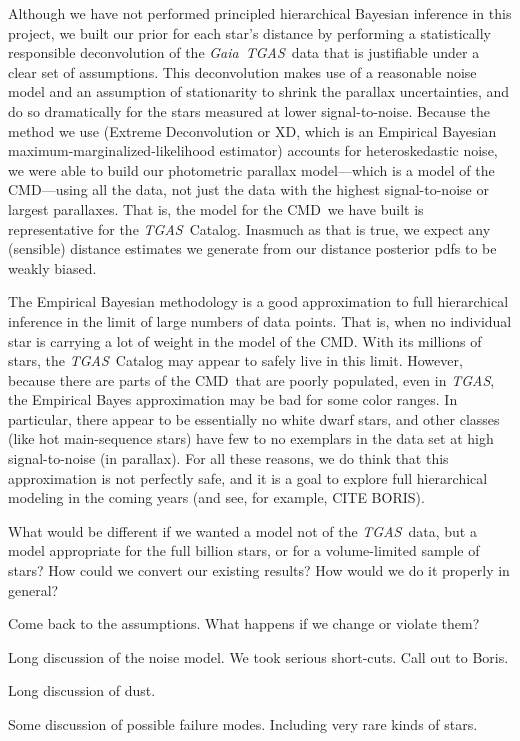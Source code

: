 \documentclass[12pt, preprint]{aastex6}
\newcommand{\acronym}[1]{{\small{#1}}}
\newcommand{\project}[1]{\textsl{#1}}
\newcommand{\tgas}{\project{\acronym{TGAS}}}
\newcommand{\gaia}{\project{Gaia}}
\newcommand{\xd}{\acronym{XD}}
\newcommand{\cmd}{\acronym{CMD}}
\begin{document}
Although we have not performed principled hierarchical Bayesian inference in this
project, we built our prior for each star's distance by
performing a statistically responsible deconvolution
of the \gaia\ \tgas\ data that is justifiable under a clear set of
assumptions.
This deconvolution makes use of a reasonable noise model and an
assumption of stationarity to shrink the parallax uncertainties, and
do so dramatically for the stars measured at lower signal-to-noise.
Because the method we use (Extreme Deconvolution or \xd, which is
an Empirical Bayesian maximum-marginalized-likelihood estimator) accounts for
heteroskedastic noise, we were able to build our photometric parallax
model---which is a model of the \cmd---using
all the data, not just the data with the highest signal-to-noise or
largest parallaxes.
That is, the model for the \cmd\ we have built is representative for
the \tgas\ Catalog.
Inasmuch as that is true, we expect any (sensible) distance estimates
we generate from our distance posterior pdfs to be weakly biased.

The Empirical Bayesian methodology is a good approximation to full
hierarchical inference in the limit of large numbers of data points.
That is, when no individual star is carrying a lot of weight in the
model of the \cmd.
With its millions of stars, the \tgas\ Catalog may appear to safely
live in this limit.
However, because there are parts of the \cmd\ that are poorly populated,
even in \tgas, the Empirical Bayes approximation may be bad for some
color ranges.
In particular, there appear to be essentially no white dwarf stars,
and other classes (like hot main-sequence stars) have few to no exemplars
in the data set at high signal-to-noise (in parallax).
For all these reasons, we do think that this approximation is not perfectly
safe, and it is a goal to explore full hierarchical modeling in the coming
years (and see, for example, CITE BORIS).

What would be different if we wanted a model not of the \tgas\ data,
but a model appropriate for the full billion stars, or for a
volume-limited sample of stars?
How could we convert our existing results?
How would we do it properly in general?

Come back to the assumptions. What happens if we change or violate them?

Long discussion of the noise model. We took serious short-cuts. Call out to Boris.

Long discussion of dust.

Some discussion of possible failure modes. Including very rare kinds of stars.
\end{document}
